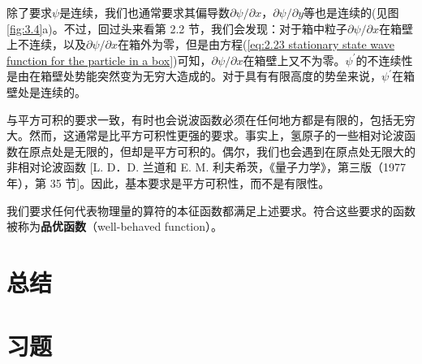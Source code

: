 	除了要求$\psi$是连续，我们也通常要求其偏导数$\partial\psi/\partial x$，$\partial\psi/\partial y$等也是连续的(见图\ref{fig:3.4}a)。不过，回过头来看第 2.2 节，我们会发现：对于箱中粒子$\partial\psi/\partial x$在箱壁上不连续，以及$\partial\psi/\partial x$在箱外为零，但是由方程(\ref{eq:2.23 stationary state wave function for the particle in a box})可知，$\partial\psi/\partial x$在箱壁上又不为零。$\psi^{\prime}$的不连续性是由在箱壁处势能突然变为无穷大造成的。对于具有有限高度的势垒来说，$\psi^{\prime}$在箱壁处是连续的。

	与平方可积的要求一致，有时也会说波函数必须在任何地方都是有限的，包括无穷大。然而，这通常是比平方可积性更强的要求。事实上，氢原子的一些相对论波函数在原点处是无限的，但却是平方可积的。偶尔，我们也会遇到在原点处无限大的非相对论波函数 [L. D．D. 兰道和 E. M. 利夫希茨，《量子力学》，第三版（1977 年），第 35 节]。因此，基本要求是平方可积性，而不是有限性。

	我们要求任何代表物理量的算符的本征函数都满足上述要求。符合这些要求的函数被称为\textbf{品优函数}（well-behaved function）。

\section*{总结}

\section*{习题}